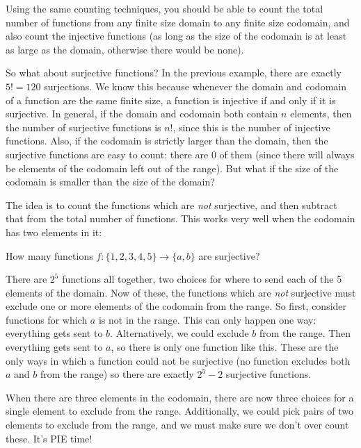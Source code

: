 \documentclass[12pt]{article}
\begin{document}
Using the same counting techniques, you should be able to count the total number of functions from any finite size domain to any finite size codomain, and also count the injective functions (as long as the size of the codomain is at least as large as the domain, otherwise there would be none).

So what about surjective functions?  In the previous example, there are exactly $5! = 120$ surjections.  We know this because whenever the domain and codomain of a function are the same finite size, a function is injective if and only if it is surjective.  In general, if the domain and codomain both contain $n$ elements, then the number of surjective functions is $n!$, since this is the number of injective functions.  Also, if the codomain is strictly larger than the domain, then the surjective functions are easy to count: there are 0 of them (since there will always be elements of the codomain left out of the range).  But what if the size of the codomain is smaller than the size of the domain?

The idea is to count the functions which are {\em not} surjective, and then subtract that from the total number of functions.  This works very well when the codomain has two elements in it:

\begin{example}
  How many functions $f: \{1,2,3,4,5\} \to \{a,b\}$ are surjective?
  \begin{solution}
    There are $2^5$ functions all together, two choices for where to send each of the 5 elements of the domain.  Now of these, the functions which are {\em not} surjective must exclude one or more elements of the codomain from the range.  So first, consider functions for which $a$ is not in the range.  This can only happen one way: everything gets sent to $b$.  Alternatively, we could exclude $b$ from the range.  Then everything gets sent to $a$, so there is only one function like this.  These are the only ways in which a function could not be surjective (no function excludes both $a$ and $b$ from the range) so there are exactly $2^5 - 2$ surjective functions.
  \end{solution}
\end{example}

When there are three elements in the codomain, there are now three choices for a single element to exclude from the range.  Additionally, we could pick pairs of two elements to exclude from the range, and we must make sure we don't over count these.  It's PIE time!
\end{document}
